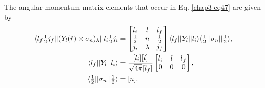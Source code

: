 The angular momentum matrix elements that occur in Eq. \eqref{chap3-eq47} are given by
\begin{align}
  \langle l_f \tfrac{1}{2} j_f || (Y_l ({\boldmath \hat{r}}) \times \sigma_n)_\lambda || l_i \tfrac{1}{2} j_i
  & = \begin{bmatrix} l_i & l & l_f\\ \tfrac{1}{2} & n & \tfrac{1}{2}\\ j_i & \lambda & j_f \end{bmatrix}
  \langle l_f || Y_l || l_i \rangle \langle\tfrac{1}{2} || \sigma_n || \tfrac{1}{2} \rangle, \label{chap3-eq48}\\
  \langle l_f || Y_l || l_i \rangle & = \frac{[l_i][l]}{\sqrt{4 \pi}[l_f]} \begin{bmatrix} l_i &l & l_f\\ 0 & 0 & 0 \end{bmatrix}, \label{chap3-eq49}\\
  \langle \tfrac{1}{2} || \sigma_n || \tfrac{1}{2} \rangle & = [n]. \label{chap3-eq50}
\end{align}

